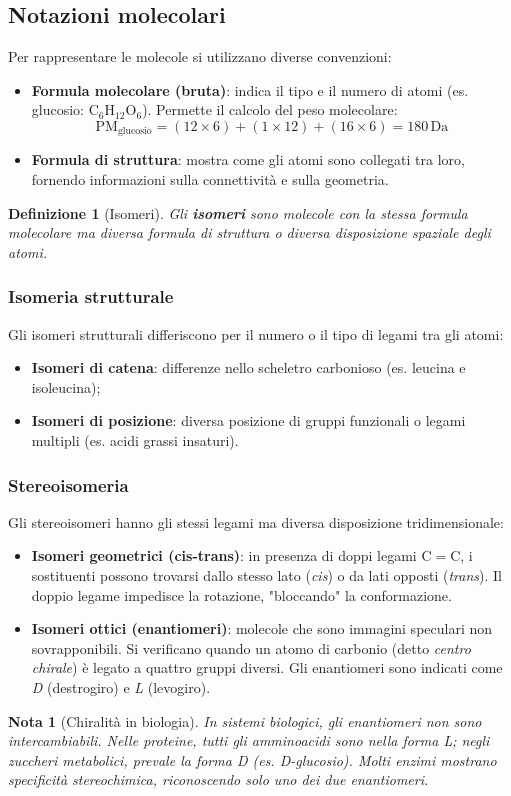 \documentclass[12pt,a4paper]{report}
\newtheorem{definizione}{Definizione}[section]
\newtheorem{nota}{Nota}[section]
\begin{document}
\subsection{Notazioni molecolari}
Per rappresentare le molecole si utilizzano diverse convenzioni:
\begin{itemize}
\item \textbf{Formula molecolare (bruta)}: indica il tipo e il numero di atomi (es. glucosio: \(\mathrm{C_6H_{12}O_6}\)). Permette il calcolo del peso molecolare:
\[
\text{PM}_{\text{glucosio}} = (12 \times 6) + (1 \times 12) + (16 \times 6) = 180\,\mathrm{Da}
\]
\item \textbf{Formula di struttura}: mostra come gli atomi sono collegati tra loro, fornendo informazioni sulla connettività e sulla geometria.
\end{itemize}
\begin{definizione}[Isomeri]
Gli \textbf{isomeri} sono molecole con la stessa formula molecolare ma diversa formula di struttura o diversa disposizione spaziale degli atomi.
\end{definizione}
\subsubsection{Isomeria strutturale}
Gli isomeri strutturali differiscono per il numero o il tipo di legami tra gli atomi:
\begin{itemize}
\item \textbf{Isomeri di catena}: differenze nello scheletro carbonioso (es. leucina e isoleucina);
\item \textbf{Isomeri di posizione}: diversa posizione di gruppi funzionali o legami multipli (es. acidi grassi insaturi).
\end{itemize}
\subsubsection{Stereoisomeria}
Gli stereoisomeri hanno gli stessi legami ma diversa disposizione tridimensionale:
\begin{itemize}
\item \textbf{Isomeri geometrici (cis-trans)}: in presenza di doppi legami \(\mathrm{C=C}\), i sostituenti possono trovarsi dallo stesso lato (\textit{cis}) o da lati opposti (\textit{trans}). Il doppio legame impedisce la rotazione, "bloccando" la conformazione.
\item \textbf{Isomeri ottici (enantiomeri)}: molecole che sono immagini speculari non sovrapponibili. Si verificano quando un atomo di carbonio (detto \textit{centro chirale}) è legato a quattro gruppi diversi. Gli enantiomeri sono indicati come \textit{D} (destrogiro) e \textit{L} (levogiro).
\end{itemize}
\begin{nota}[Chiralità in biologia]
In sistemi biologici, gli enantiomeri non sono intercambiabili. Nelle proteine, tutti gli amminoacidi sono nella forma \textit{L}; negli zuccheri metabolici, prevale la forma \textit{D} (es. \textit{D}-glucosio). Molti enzimi mostrano specificità stereochimica, riconoscendo solo uno dei due enantiomeri.
\end{nota}
\end{document}
